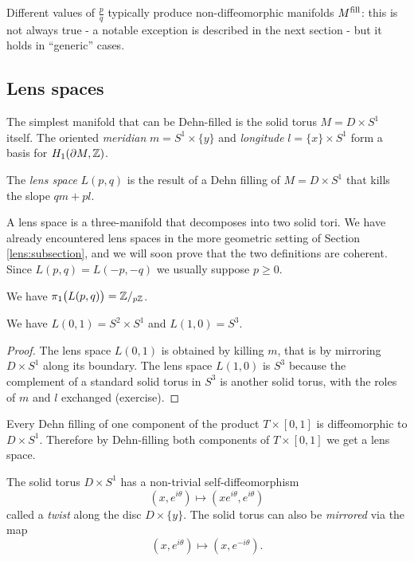 Different values of $\frac pq$ typically produce non-diffeomorphic manifolds $M^{\rm fill}$: this is not always true - a notable exception is described in the next section - but it holds in ``generic'' cases.

\subsection{Lens spaces}
The simplest manifold that can be Dehn-filled is the solid torus $M=D\times S^1$ itself. The oriented \emph{meridian} $m=S^1 \times \{y\}$ and \emph{longitude} $l=\{x\}\times S^1$ form a basis for $H_1(\partial M,\mathbb{Z})$.

\begin{defn} The \emph{lens space} $L(p,q)$ is the result of a Dehn filling of $M=D\times S^1$ that kills the slope $qm+pl$.
\end{defn}

A lens space is a three-manifold that decomposes into two solid tori. We have already encountered lens spaces in the more geometric setting of Section \ref{lens:subsection}, and we will soon prove that the two definitions are coherent. Since $L(p,q)=L(-p,-q)$ we usually suppose $p\geqslant 0$.

\begin{ex}
We have $\pi_1\big(L(p,q)\big) = \mathbb{Z}/_{p\mathbb{Z}}$. 
\end{ex}

\begin{prop}
We have $L(0,1) = S^2\times S^1$ and $L(1,0) = S^3$.
\end{prop}
\begin{proof}
The lens space $L(0,1)$ is obtained by killing $m$, that is by mirroring $D\times S^1$ along its boundary. The lens space $L(1,0)$ is $S^3$ because the complement of a standard solid torus in $S^3$ is another solid torus, with the roles of $m$ and $l$ exchanged (exercise).
\end{proof}

\begin{ex} \label{fill:T:ex}
Every Dehn filling of one component of the product $T\times [0,1]$ is diffeomorphic to $D\times S^1$. Therefore by Dehn-filling both components of $T\times [0,1]$ we get a lens space.
\end{ex}

The solid torus $D\times S^1$ has a non-trivial self-diffeomorphism 
$$(x, e^{i\theta}) \longmapsto (xe^{i\theta}, e^{i\theta})$$
called a \emph{twist} along the disc $D\times \{y\}$. The solid torus can also be \emph{mirrored} via the map
$$(x,e^{i\theta}) \longmapsto (x,e^{-i\theta}).$$

